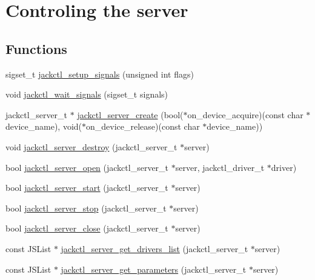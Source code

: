 \hypertarget{group__ServerControl}{\section{\-Controling the server}
\label{d2/d3b/group__ServerControl}
}
\subsection*{\-Functions}
\begin{DoxyCompactItemize}
\item 
sigset\-\_\-t \hyperlink{group__ServerControl_gaaf1bee06690f756a6ffb463580590518}{jackctl\-\_\-setup\-\_\-signals} (unsigned int flags)
\item 
void \hyperlink{group__ServerControl_ga90d8e0221779a24483fe4f4cce775d51}{jackctl\-\_\-wait\-\_\-signals} (sigset\-\_\-t signals)
\item 
jackctl\-\_\-server\-\_\-t $\ast$ \hyperlink{group__ServerControl_ga8b8c36f1be47c0d582e36ee2ea21e7bb}{jackctl\-\_\-server\-\_\-create} (bool($\ast$on\-\_\-device\-\_\-acquire)(const char $\ast$device\-\_\-name), void($\ast$on\-\_\-device\-\_\-release)(const char $\ast$device\-\_\-name))
\item 
void \hyperlink{group__ServerControl_gab6f848f11e9853f49d82f253c1df1121}{jackctl\-\_\-server\-\_\-destroy} (jackctl\-\_\-server\-\_\-t $\ast$server)
\item 
bool \hyperlink{group__ServerControl_gad2b438d61acdadc96368ff2dd4e9e62f}{jackctl\-\_\-server\-\_\-open} (jackctl\-\_\-server\-\_\-t $\ast$server, jackctl\-\_\-driver\-\_\-t $\ast$driver)
\item 
bool \hyperlink{group__ServerControl_gaa573e4c5e35e853d199cf5b7368700b5}{jackctl\-\_\-server\-\_\-start} (jackctl\-\_\-server\-\_\-t $\ast$server)
\item 
bool \hyperlink{group__ServerControl_gaf71c3fbc808e15305277e667ca6cfac4}{jackctl\-\_\-server\-\_\-stop} (jackctl\-\_\-server\-\_\-t $\ast$server)
\item 
bool \hyperlink{group__ServerControl_gab09dea0a3ffc38e439cbceaa33951a2c}{jackctl\-\_\-server\-\_\-close} (jackctl\-\_\-server\-\_\-t $\ast$server)
\item 
const \-J\-S\-List $\ast$ \hyperlink{group__ServerControl_ga3edd82a413260dc1f4de2862f0a6a669}{jackctl\-\_\-server\-\_\-get\-\_\-drivers\-\_\-list} (jackctl\-\_\-server\-\_\-t $\ast$server)
\item 
const \-J\-S\-List $\ast$ \hyperlink{group__ServerControl_gaeaefa3144a6a9d843467d4951ca71f70}{jackctl\-\_\-server\-\_\-get\-\_\-parameters} (jackctl\-\_\-server\-\_\-t $\ast$server)

\end{DoxyCompactItemize}
